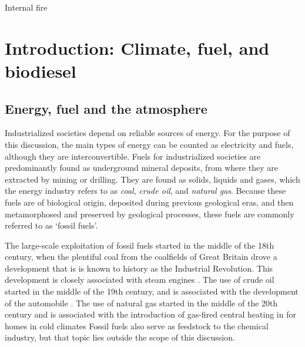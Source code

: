 \begin{savequote}[45mm]
Internal fire
\end{savequote}


\chapter{Introduction: Climate, fuel, and biodiesel} %

\label{Chapter1} %


\section{Energy, fuel and the atmosphere}

Industrialized societies depend on reliable sources of energy. For the purpose
of this discussion, the main types of energy can be counted as electricity and
fuels, although they are interconvertible. Fuels for industrialized societies
are predominantly found as underground mineral deposits, from where they are
extracted by mining or drilling. They are found as solids, liquids and gases,
which the energy industry refers to as \textit{coal}, \textit{crude oil}, and
\textit{natural gas}. Because these fuels are of biological origin, deposited
during previous geological eras, and then metamorphosed and preserved by
geological processes, these fuels are commonly referred to as `fossil fuels'.

The large-scale exploitation of fossil fuels started in the middle of the 18th
century, when the plentiful coal from the coalfields of Great Britain drove a
development that is is known to history as the Industrial Revolution. This
development is closely associated with steam engines \autocite{Rosen2012}. The
use of crude oil started in the middle of the 19th century, and is associated
with the development of the automobile \autocite[p. 42]{Watts2005}. The use of
natural gas started in the middle of the 20th century and is associated with the
introduction of gas-fired central heating in for homes in cold climates
\autocite{Hanmer2017} Fossil fuels also serve as feedstock to the chemical
industry, but that topic lies outside the scope of this discussion.


